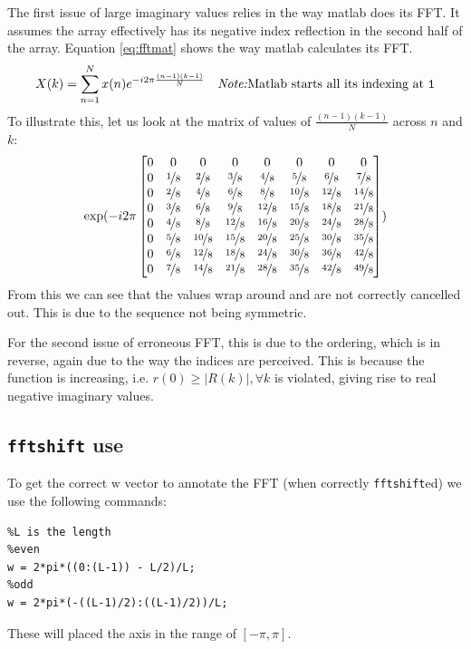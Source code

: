 \documentclass[10pt,twoside,a4paper]{report}
\begin{document}
The first issue of large imaginary values relies in the way matlab does its FFT. It assumes the array effectively has its negative index reflection in the second half of the array. Equation \ref{eq:fftmat} shows the way matlab calculates its FFT.
\begin{align}
X(k) &= \sum_{n=1}^{N} x(n) e^{-i2\pi\frac{(n-1)(k-1)}{N}} & \text{\hfill\textit{Note:}Matlab starts all its indexing at \texttt{1}}
\label{eq:fftmat}
\end{align}
To illustrate this, let us look at the matrix of values of $\frac{(n-1)(k-1)}{N}$ across $n$ and $k$:
\begin{equation}
\exp(-i2\pi \begin{bmatrix}
0 & 0 & 0 & 0 & 0 & 0 & 0 & 0\\ 
0 & \nicefrac{1}{8} & \nicefrac{2}{8}  & \nicefrac{3}{8}  & \nicefrac{4}{8}  & \nicefrac{5}{8}  & \nicefrac{6}{8}  & \nicefrac{7}{8} \\ 
0 & \nicefrac{2}{8} & \nicefrac{4}{8}  & \nicefrac{6}{8}  & \nicefrac{8}{8}  & \nicefrac{10}{8} & \nicefrac{12}{8} & \nicefrac{14}{8}\\ 
0 & \nicefrac{3}{8} & \nicefrac{6}{8}  & \nicefrac{9}{8}  & \nicefrac{12}{8} & \nicefrac{15}{8} & \nicefrac{18}{8} & \nicefrac{21}{8}\\ 
0 & \nicefrac{4}{8} & \nicefrac{8}{8}  & \nicefrac{12}{8} & \nicefrac{16}{8} & \nicefrac{20}{8} & \nicefrac{24}{8} & \nicefrac{28}{8}\\ 
0 & \nicefrac{5}{8} & \nicefrac{10}{8} & \nicefrac{15}{8} & \nicefrac{20}{8} & \nicefrac{25}{8} & \nicefrac{30}{8} & \nicefrac{35}{8}\\ 
0 & \nicefrac{6}{8} & \nicefrac{12}{8} & \nicefrac{18}{8} & \nicefrac{24}{8} & \nicefrac{30}{8} & \nicefrac{36}{8} & \nicefrac{42}{8}\\ 
0 & \nicefrac{7}{8} & \nicefrac{14}{8} & \nicefrac{21}{8} & \nicefrac{28}{8} & \nicefrac{35}{8} & \nicefrac{42}{8} & \nicefrac{49}{8}
\end{bmatrix})
\end{equation}
From this we can see that the values wrap around and are not correctly cancelled out. This is due to the sequence not being symmetric.

For the second issue of erroneous FFT, this is due to the ordering, which is in reverse, again due to the way the indices are perceived.  This is because the function is increasing, i.e. $r(0) \geq |R(k)| , \forall k$ is violated, giving rise to real negative imaginary values.
\subsection{\texttt{fftshift} use}
To get the correct $\boldsymbol{\mathrm{w}}$ vector to annotate the FFT (when correctly \texttt{fftshift}ed) we use the following commands:
\begin{lstlisting}
%L is the length
%even
w = 2*pi*((0:(L-1)) - L/2)/L;
%odd
w = 2*pi*(-((L-1)/2):((L-1)/2))/L;
\end{lstlisting}
These will placed the axis in the range of $[-\pi,\pi]$.
\end{document}
